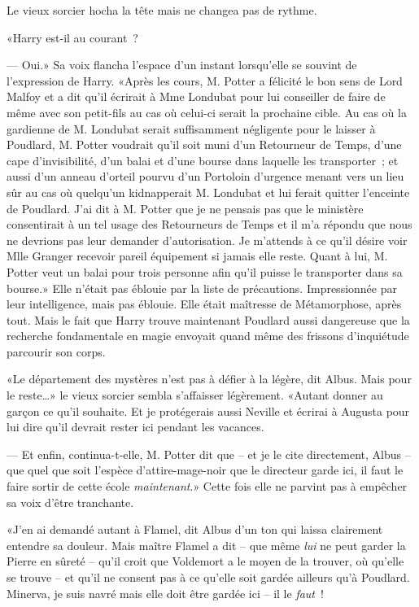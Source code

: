 Le vieux sorcier hocha la tête mais ne changea pas de rythme.

«Harry est-il au courant~?

--- Oui.» Sa voix flancha l'espace d'un instant lorsqu'elle se souvint de l'expression de Harry. «Après les cours, M. Potter a félicité le bon sens de Lord Malfoy et a dit qu'il écrirait à Mme Londubat pour lui conseiller de faire de même avec son petit-fils au cas où celui-ci serait la prochaine cible. Au cas où la gardienne de M. Londubat serait suffisamment négligente pour le laisser à Poudlard, M. Potter voudrait qu'il soit muni d'un Retourneur de Temps, d'une cape d'invisibilité, d'un balai et d'une bourse dans laquelle les transporter~; et aussi d'un anneau d'orteil pourvu d'un Portoloin d'urgence menant vers un lieu sûr au cas où quelqu'un kidnapperait M. Londubat et lui ferait quitter l'enceinte de Poudlard. J'ai dit à M. Potter que je ne pensais pas que le ministère consentirait à un tel usage des Retourneurs de Temps et il m'a répondu que nous ne devrions pas leur demander d'autorisation. Je m'attends à ce qu'il désire voir Mlle Granger recevoir pareil équipement si jamais elle reste. Quant à lui, M. Potter veut un balai pour trois personne afin qu'il puisse le transporter dans sa bourse.» Elle n'était pas éblouie par la liste de précautions. Impressionnée par leur intelligence, mais pas éblouie. Elle était maîtresse de Métamorphose, après tout. Mais le fait que Harry trouve maintenant Poudlard aussi dangereuse que la recherche fondamentale en magie envoyait quand même des frissons d'inquiétude parcourir son corps.

«Le département des mystères n'est pas à défier à la légère, dit Albus. Mais pour le reste…» le vieux sorcier sembla s'affaisser légèrement. «Autant donner au garçon ce qu'il souhaite. Et je protégerais aussi Neville et écrirai à Augusta pour lui dire qu'il devrait rester ici pendant les vacances.

--- Et enfin, continua-t-elle, M. Potter dit que -- et je le cite directement, Albus -- que quel que soit l'espèce d'attire-mage-noir que le directeur garde ici, il faut le faire sortir de cette école \emph{maintenant}.» Cette fois elle ne parvint pas à empêcher sa voix d'être tranchante.

«J'en ai demandé autant à Flamel, dit Albus d'un ton qui laissa clairement entendre sa douleur. Mais maître Flamel a dit -- que même \emph{lui} ne peut garder la Pierre en sûreté -- qu'il croit que Voldemort a le moyen de la trouver, où qu'elle se trouve -- et qu'il ne consent pas à ce qu'elle soit gardée ailleurs qu'à Poudlard. Minerva, je suis navré mais elle doit être gardée ici -- il le \emph{faut}~!

